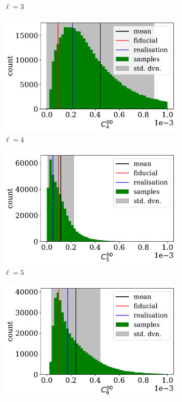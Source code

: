 \begin{figure}
\begin{subfigure}{.5\textwidth}
  \caption{$\ell = 3$}
\end{subfigure}
\begin{subfigure}{.5\textwidth}
  \centering
  \includegraphics[width=\textwidth]{BPL-FIGS/Euclid-LN-PNoi-N32-HDens_HISTOGRAM-ell-04.pdf}
  \caption{$\ell = 4$}
\end{subfigure}
\begin{subfigure}{.5\textwidth}
  \centering
  \includegraphics[width=\textwidth]{BPL-FIGS/Euclid-LN-PNoi-N32-HDens_HISTOGRAM-ell-05.pdf}
  \caption{$\ell = 5$}
\end{subfigure}
\begin{center}
\begin{subfigure}{.5\textwidth}
  \centering
  \includegraphics[width=\textwidth]{BPL-FIGS/Euclid-LN-PNoi-N32-HDens_HISTOGRAM-ell-06.pdf}

\end{subfigure}
\end{center}
\end{figure}
